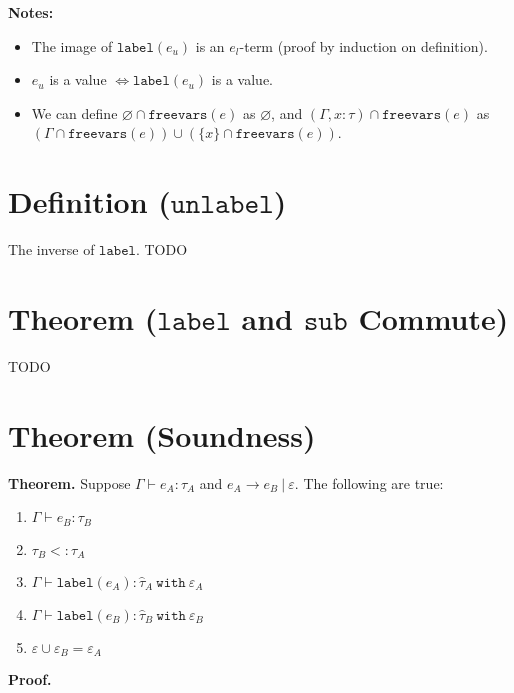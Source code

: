\documentclass{llncs}
\newcommand{\keywadj}[1]{\mathtt{#1}}
\newcommand{\keyw}[1]{\keywadj{#1}~}
\newcommand{\kwa}[1]{\keywadj{ #1 }}
\newcommand{\type}[2]{
	#1~\keyw{with} #2
}
\begin{document}
\noindent \textbf{Notes:}
\begin{itemize}
	\item The image of $\kwa{label}(e_u)$ is an $e_l$-term (proof by induction on definition).
	\item $e_u$ is a value $\iff \kwa{label}(e_u)$ is a value.
	\item We can define $\varnothing \cap \kwa{freevars}(e)$ as $\varnothing$, and $(\Gamma, x : \tau) \cap \kwa{freevars}(e)$ as $(\Gamma \cap \kwa{freevars}(e)) \cup (\{ x \} \cap \kwa{freevars}(e))$.
\end{itemize}





\section{Definition ($\keywadj{unlabel}$)}

The inverse of $\kwa{label}$. TODO






\section{Theorem ($\kwa{label}$ and $\kwa{sub}$ Commute)}

TODO






\section{Theorem (Soundness)}

\textbf{Theorem.} Suppose $\Gamma \vdash e_A : \tau_A$ and $e_A \longrightarrow e_B~|~\varepsilon$. The following are true:

	\begin{enumerate}
	\item $\Gamma \vdash e_B : \tau_B$
	\item $\tau_B <: \tau_A$
	\item $\Gamma \vdash \kwa{label}(e_A) : \type{\hat \tau_A}{\varepsilon_A}$
	\item $\Gamma \vdash \kwa{label}(e_B) : \type{\hat \tau_B}{\varepsilon_B}$
	\item $\varepsilon \cup \varepsilon_B = \varepsilon_A$
	\end{enumerate}

\noindent
\textbf{Proof.} 
\end{document}
